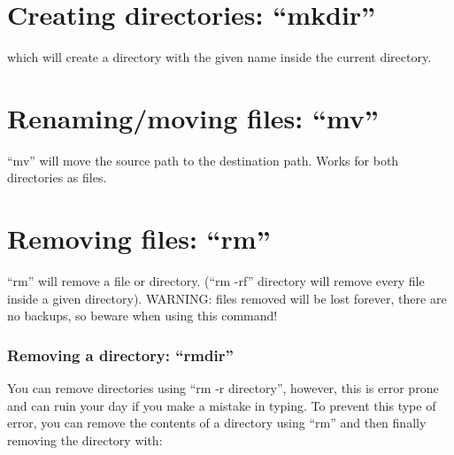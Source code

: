 \section{Creating directories: ``mkdir''}

\begin{prompt}
\end{prompt}

which will create a directory with the given name inside the current directory.

\section{Renaming/moving files: ``mv''}

\begin{prompt}
\end{prompt}

``mv'' will move the source path to the destination path. Works for both directories as files.

\section{Removing files: ``rm''}


\begin{prompt}
\end{prompt}

``rm'' will remove a file or directory. (``rm -rf'' directory will remove every
file inside a given directory). WARNING: files removed will be lost forever,
there are no backups, so beware when using this command!

\subsubsection{Removing a directory: ``rmdir''}

You can remove directories using ``rm -r directory'', however, this is error
prone and can ruin your day if you make a mistake in typing. To prevent this
type of error, you can remove the contents of a directory using ``rm''
and then finally removing the directory with:

\begin{prompt}
\end{prompt}

